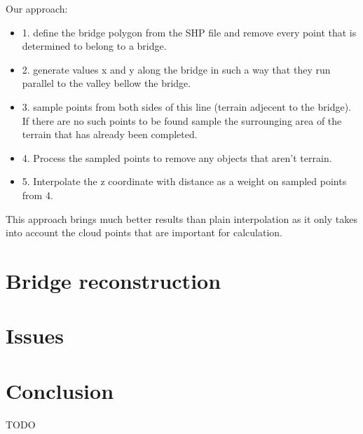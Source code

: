 \documentclass{egpubl-eurovis-star}
\begin{document}
Our approach:
\begin{itemize}
\item{1. define the bridge polygon from the SHP file and remove every point that is determined to belong to a bridge.}
\item{2. generate values x and y along the bridge in such a way that they run parallel to the valley bellow the bridge. }
\item{3. sample points from both sides of this line (terrain adjecent to the bridge). 
If there are no such points to be found sample the surrounging area of the terrain that has already been completed.}
\item{4. Process the sampled points to remove any objects that aren't terrain.}
\item{5. Interpolate the z coordinate with distance as a weight on sampled points from 4.}
\end{itemize}

This approach brings much better results than plain interpolation as it only takes into account the cloud points that are important for calculation.

\section{Bridge reconstruction}


\section{Issues}



\section{Conclusion}
TODO


%



\end{document}

